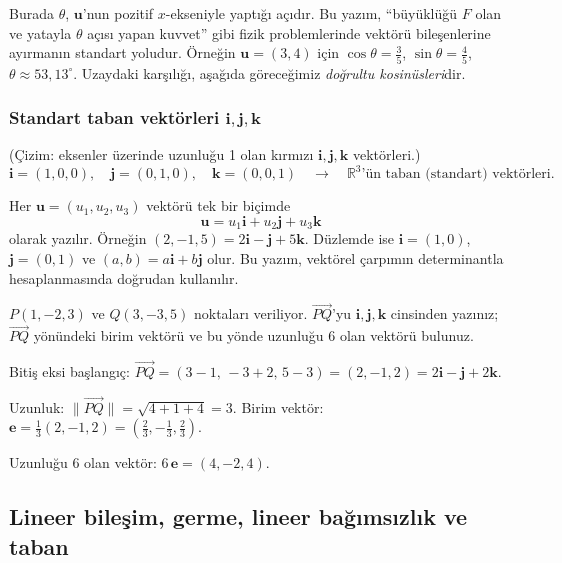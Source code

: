 Burada $\theta$, $\mathbf u$'nun pozitif $x$-ekseniyle yaptığı açıdır. Bu yazım, ``büyüklüğü $F$ olan ve yatayla $\theta$ açısı yapan kuvvet'' gibi fizik problemlerinde vektörü bileşenlerine ayırmanın standart yoludur. Örneğin $\mathbf u=(3,4)$ için $\cos\theta=\frac35$, $\sin\theta=\frac45$, $\theta\approx 53{,}13^\circ$. Uzaydaki karşılığı, aşağıda göreceğimiz \emph{doğrultu kosinüsleri}dir.

\subsubsection{Standart taban vektörleri $\mathbf i,\mathbf j,\mathbf k$}

\begin{tahta}
(Çizim: eksenler üzerinde uzunluğu 1 olan kırmızı $\mathbf i,\mathbf j,\mathbf k$ vektörleri.)
\[
\mathbf i=(1,0,0),\quad \mathbf j=(0,1,0),\quad \mathbf k=(0,0,1)\quad\to\quad \mathbb R^3\text{'ün taban (standart) vektörleri.}
\]
\end{tahta}

Her $\mathbf u=(u_1,u_2,u_3)$ vektörü tek bir biçimde
\[
\mathbf u=u_1\mathbf i+u_2\mathbf j+u_3\mathbf k
\]
olarak yazılır. Örneğin $(2,-1,5)=2\mathbf i-\mathbf j+5\mathbf k$. Düzlemde ise $\mathbf i=(1,0)$, $\mathbf j=(0,1)$ ve $(a,b)=a\mathbf i+b\mathbf j$ olur. Bu yazım, vektörel çarpımın determinantla hesaplanmasında doğrudan kullanılır.

\begin{soru}
$P(1,-2,3)$ ve $Q(3,-3,5)$ noktaları veriliyor. $\overrightarrow{PQ}$'yu $\mathbf i,\mathbf j,\mathbf k$ cinsinden yazınız; $\overrightarrow{PQ}$ yönündeki birim vektörü ve bu yönde uzunluğu 6 olan vektörü bulunuz.
\end{soru}
\begin{cevap}
Bitiş eksi başlangıç: $\overrightarrow{PQ}=(3-1,\,-3+2,\,5-3)=(2,-1,2)=2\mathbf i-\mathbf j+2\mathbf k$.

Uzunluk: $\|\overrightarrow{PQ}\|=\sqrt{4+1+4}=3$. Birim vektör: $\mathbf e=\frac13(2,-1,2)=\left(\frac23,-\frac13,\frac23\right)$.

Uzunluğu 6 olan vektör: $6\,\mathbf e=(4,-2,4)$.
\end{cevap}

\subsection{Lineer bileşim, germe, lineer bağımsızlık ve taban}

